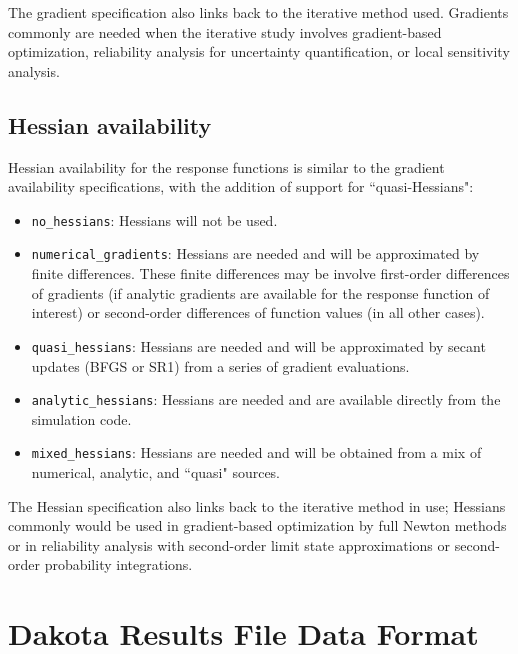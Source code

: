 The gradient specification also links back to the iterative method
used. Gradients commonly are needed when the iterative
study involves gradient-based optimization, reliability analysis for
uncertainty quantification, or local sensitivity analysis.

\subsection{Hessian availability}\label{responses:overview:hessian}

Hessian availability for the response functions is similar to the
gradient availability specifications, with the addition of support
for ``quasi-Hessians":

\begin{itemize}

\item \texttt{no\_hessians}: Hessians will not be used.

\item \texttt{numerical\_gradients}: Hessians are needed and will be
  approximated by finite differences.  These finite differences may be
  involve first-order differences of gradients (if analytic gradients
  are available for the response function of interest) or second-order 
  differences of function values (in all other cases).

\item \texttt{quasi\_hessians}: Hessians are needed and will be 
  approximated by secant updates (BFGS or SR1) from a series of 
  gradient evaluations.

\item \texttt{analytic\_hessians}: Hessians are needed and are
  available directly from the simulation code.

\item \texttt{mixed\_hessians}: Hessians are needed and will be 
  obtained from a mix of numerical, analytic, and ``quasi" sources.

\end{itemize}

The Hessian specification also links back to the iterative method in
use; Hessians commonly would be used in gradient-based
optimization by full Newton methods or in reliability analysis
with second-order limit state approximations or second-order
probability integrations.

\section{Dakota Results File Data Format}\label{responses:results}

